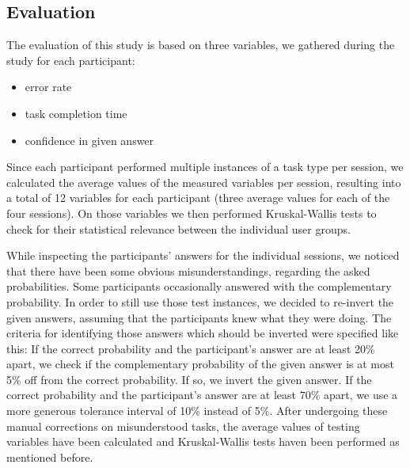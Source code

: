 \subsection*{Evaluation}

The evaluation of this study is based on three variables, we gathered during the study for each participant:

\begin{itemize}
\item error rate
\item task completion time
\item confidence in given answer
\end{itemize}

Since each participant performed multiple instances of a task type per session, we calculated the average values of the measured variables per session, resulting into a total of 12 variables for each participant (three average values for each of the four sessions). On those variables we then performed Kruskal-Wallis tests to check for their statistical relevance between the individual user groups. \par \medskip

While inspecting the participants' answers for the individual sessions, we noticed that there have been some obvious misunderstandings, regarding the asked probabilities. Some participants occasionally answered with the complementary probability. In order to still use those test instances, we decided to re-invert the given answers, assuming that the participants knew what they were doing. The criteria for identifying those answers which should be inverted were specified like this: If the correct probability and the participant's answer are at least 20\% apart, we check if the complementary probability of the given answer is at most 5\% off from the correct probability. If so, we invert the given answer. If the correct probability and the participant's answer are at least 70\% apart, we use a more generous tolerance interval of 10\% instead of 5\%. After undergoing these manual corrections on misunderstood tasks, the average values of testing variables have been calculated and Kruskal-Wallis tests haven been performed as mentioned before.